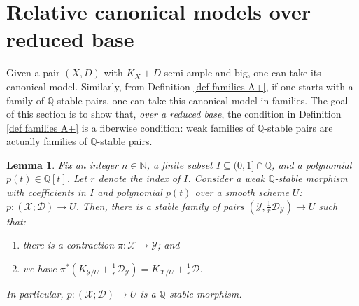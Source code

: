 \documentclass{amsart}
\newcommand{\bQ}{\mathbb{Q}}
\newcommand{\cD}{\mathcal{D}}
\newcommand{\cX}{\mathcal{X}}
\newcommand{\cY}{\mathcal{Y}}
\newtheorem{Lemma}[theorem]{Lemma}
\theoremstyle{definition}
\def\K#1.{K_{#1}}
\begin{document}
\section{Relative canonical models over reduced base}
\label{section morphism}
Given a pair $(X,D)$ with $K_X+D$ semi-ample and big, one can take its canonical model.
Similarly, from Definition \ref{def families A+}, if one starts with a family of $\bQ$-stable pairs, one can take this canonical model in families.
The goal of this section is to show that, \textit{over a reduced base}, the condition in Definition \ref{def families A+} is a fiberwise condition:
weak families of $\bQ$-stable pairs are actually families of $\bQ$-stable pairs.


\begin{Lemma}\label{Lemma:slc:canonical:model:for:p:pairs}
Fix an integer $n\in \mathbb{N}$, a finite subset $I\subseteq (0,1] \cap \mathbb{Q}$, and a polynomial $p(t) \in \mathbb{Q}[t]$.
Let $r$ denote the index of $I$.
Consider a weak $\bQ$-stable morphism with coefficients in $I$ and polynomial $p(t)$ over a smooth scheme $U$:
$p \colon (\cX;\cD)\to U$.
Then, there is a stable family of pairs $(\cY,\frac{1}{r}\cD_\cY)\to U$ such that:
\begin{enumerate}
    \item there is a contraction $\pi \colon \cX \to \cY$; and
    \item we have $\pi^* (\K \cY/U. + \frac{1}{r}\cD_\cY) = \K \cX /U. + \frac{1}{r}\cD$.
\end{enumerate}
In particular, $p \colon (\cX;\cD)\to U$ is a $\bQ$-stable morphism.
\end{Lemma}
\end{document}
